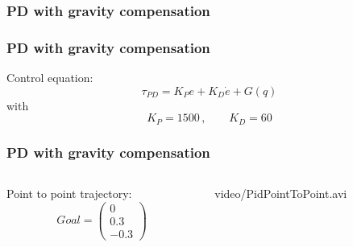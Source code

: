 \subsubsection{PD with gravity compensation}
\begin{frame}
\frametitle{PD with gravity compensation}
Control equation:
\begin{equation}
	\tau_{PD} = K_Pe + K_D\dot{e}+G(q)
\end{equation}
with
\[ K_P = 1500\,, \qquad K_D = 60\]
\end{frame}
%
\begin{frame}
\frametitle{PD with gravity compensation}
%
\begin{columns}
\begin{column}{0.4\textwidth}
	Point to point trajectory:
	\begin{equation*}
		Goal=%
		\begin{pmatrix}
		0\\
		0.3\\
		-0.3
		\end{pmatrix}
	\end{equation*}
\end{column}
\begin{column}{0.6\textwidth}
	\begin{center}
		{video/PidPointToPoint.avi}
	\end{center}
\end{column}
\end{columns}
\end{frame}
%
